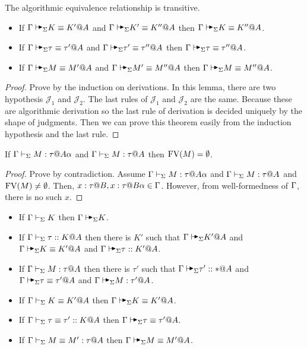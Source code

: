 \begin{lemma}
    The algorithmic equivalence relationship is transitive.
    \label{lemma:TransitioninAlgorithmicEquivalence}
    \begin{itemize}
        \item If \( \G \AVS K \E K' @ A \) and \( \G \AVS K' \E K'' @ A \) then \( \G \AVS K \E K'' @ A \).
        \item If \( \G \AVS \tau \E \tau' @ A \) and \( \G \AVS \tau' \E \tau'' @ A \) then \( \G \AVS \tau \E \tau'' @ A \).
        \item If \( \G \AVS M \E M' @ A \) and \( \G \AVS M' \E M'' @ A \) then \( \G \AVS M \E M'' @ A \).
    \end{itemize}
\end{lemma}

\begin{proof}
    Prove by the induction on derivations.  In this lemma, there are two
    hypothesis \( \mathcal{J}_1 \) and \( \mathcal{J}_2 \).  The last rules of
    \( \mathcal{J}_1 \) and \( \mathcal{J}_2 \) are the same.  Because these
    are algorithmic derivation so the last rule of derivation is decided
    uniquely by the shape of judgments.  Then we can prove this theorem easily
    from the induction hypothesis and the last rule.
\end{proof}

\begin{lemma}
    \label{lemma:FreeVariableandStage}
    If \( \G\V M:\tau@{A\alpha} \) and \( \Gamma\vdash_\Sigma M:\tau @A \) then \( \text{FV}(M) = \emptyset \).
\end{lemma}

\begin{proof}
    Prove by contradiction. Assume \( \G\V M:\tau@{A\alpha} \) and \( \Gamma\vdash_\Sigma
    M:\tau @A \) and \( \text{FV}(M) \neq \emptyset \). Then, \( x : \tau @ B, x:
    \tau @ B\alpha \in \Gamma \). However, from well-formedness of \( \Gamma \), there
    is no such \( x \).
\end{proof}

\begin{theorem}
    \label{theorem:CompletenessofAlgorithmicTyping}
    \begin{itemize}
        \item If \(\Gamma\vdash_\Sigma K \) then \(\G\AVS K \).
        \item If \(\Gamma\vdash_\Sigma \tau ::K @ A \) then there is \(K'\) such that \( \G \AVS K' @ A \) and \( \G \AVS K\E K' @ A \) and \( \G\AVS \tau :: K' @ A \).
        \item If \(\Gamma\vdash_\Sigma M:\tau @ A \) then there is \(\tau'\) such that \( \G \AVS \tau' :: * @ A \) and \( \G \AVS \tau \E \tau' @ A \) and \( \G\AVS M:\tau' @ A \).
        \item If \(\Gamma\vdash_\Sigma K\equiv K' @ A \) then \(\G\AVS K\E K' @ A \).
        \item If \(\Gamma\vdash_\Sigma \tau \equiv \tau' :: K @ A \) then \(\G\AVS \tau \E \tau' @ A \).
        \item If \(\Gamma\vdash_\Sigma M\equiv M' : \tau @ A \) then \(\G \AVS M \E M' @ A \).
    \end{itemize}
\end{theorem}

